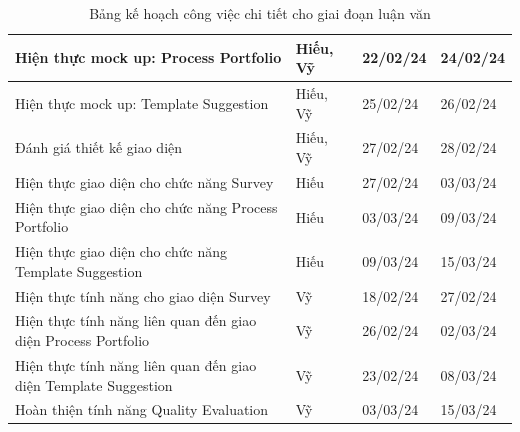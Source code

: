 \begin{table}[H]
{\begin{tabular}{|p{11cm}|p{1.75cm}|p{1.5cm}|p{1.5cm}|}
      Hiện thực mock up: Process Portfolio                            & Hiếu, Vỹ & 22/02/24 & 24/02/24 \\ \hline
      Hiện thực mock up: Template Suggestion                          & Hiếu, Vỹ & 25/02/24 & 26/02/24 \\ \hline
      Đánh giá thiết kế giao diện                                     & Hiếu, Vỹ & 27/02/24 & 28/02/24 \\ \hline
      Hiện thực giao diện cho chức năng Survey                        & Hiếu     & 27/02/24 & 03/03/24 \\ \hline
      Hiện thực giao diện cho chức năng Process Portfolio             & Hiếu     & 03/03/24 & 09/03/24 \\ \hline
      Hiện thực giao diện cho chức năng Template Suggestion           & Hiếu     & 09/03/24 & 15/03/24 \\ \hline
      Hiện thực tính năng cho giao diện Survey                        & Vỹ       & 18/02/24 & 27/02/24 \\ \hline
      Hiện thực tính năng liên quan đến giao diện Process Portfolio   & Vỹ       & 26/02/24 & 02/03/24 \\ \hline
      Hiện thực tính năng liên quan đến giao diện Template Suggestion & Vỹ       & 23/02/24 & 08/03/24 \\ \hline
      Hoàn thiện tính năng Quality Evaluation                         & Vỹ       & 03/03/24 & 15/03/24 \\ \hline
    \end{tabular}}
    \vspace{0.5cm}
    \caption{Bảng kế hoạch công việc chi tiết cho giai đoạn luận văn}
\end{table}

